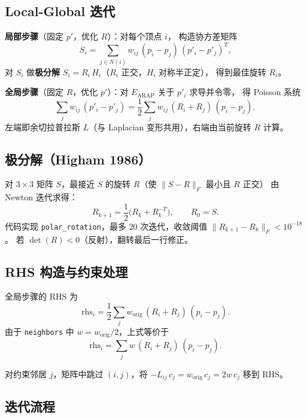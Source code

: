 \documentclass[11pt,a4paper]{article}
\begin{document}
\subsection{Local-Global 迭代}

\textbf{局部步骤}（固定 $p'$，优化 $R$）：对每个顶点 $i$，
构造协方差矩阵
\[
  S_i = \sum_{j \in N(i)} w_{ij}\, (p_i - p_j)\,(p'_i - p'_j)^T,
\]
对 $S_i$ 做\textbf{极分解} $S_i = R_i\, H_i$（$R_i$ 正交，$H_i$ 对称半正定），
得到最佳旋转 $R_i$。

\textbf{全局步骤}（固定 $R$，优化 $p'$）：对 $E_{\text{ARAP}}$ 关于 $p'_i$ 求导并令零，
得 Poisson 系统
\[
  \sum_j w_{ij}\,(p'_i - p'_j) = \frac{1}{2}\sum_j w_{ij}\,(R_i + R_j)\,(p_i - p_j),
\]
左端即余切拉普拉斯 $L$（与 Laplacian 变形共用），右端由当前旋转 $R$ 计算。

\subsection{极分解（Higham 1986）}

对 $3\times3$ 矩阵 $S$，最接近 $S$ 的旋转 $R$（使 $\|S - R\|_F$ 最小且 $R$ 正交）
由 Newton 迭代求得：
\[
  R_{k+1} = \frac{1}{2}\bigl(R_k + R_k^{-T}\bigr), \qquad R_0 = S.
\]
代码实现 \texttt{polar\_rotation}，最多 20 次迭代，收敛阈值 $\|R_{k+1} - R_k\|_F < 10^{-18}$。
若 $\det(R) < 0$（反射），翻转最后一行修正。

\subsection{RHS 构造与约束处理}

全局步骤的 RHS 为
\[
  \text{rhs}_i = \frac{1}{2}\sum_j w_{\text{orig}}\,(R_i + R_j)\,(p_i - p_j).
\]
由于 \texttt{neighbors} 中 $w = w_{\text{orig}}/2$，上式等价于
\[
  \text{rhs}_i = \sum_j w\,(R_i + R_j)\,(p_i - p_j).
\]

对约束邻居 $j$，矩阵中跳过 $(i, j)$，将 $-L_{ij}\, c_j = w_{\text{orig}}\, c_j = 2w\, c_j$ 移到 RHS。

\subsection{迭代流程}
\end{document}
